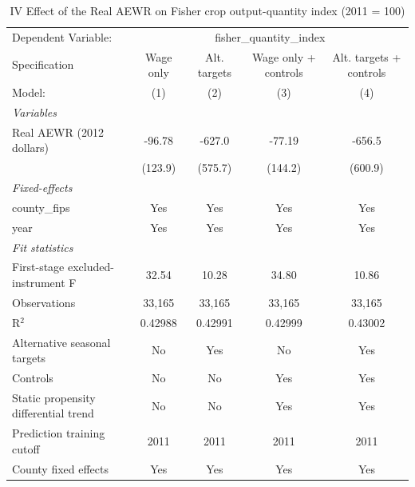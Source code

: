 
\begin{table}[htbp]
   \caption{\label{tab:iv_output_quantities} IV Effect of the Real AEWR on Fisher crop output-quantity index (2011 = 100)}
   \centering
   \begin{tabular}{lcccc}
      \tabularnewline \midrule \midrule
      Dependent Variable: & \multicolumn{4}{c}{fisher\_quantity\_index}\\
      Specification                        & Wage only & Alt. targets & Wage only + controls & Alt. targets + controls \\   
      Model:                               & (1)       & (2)          & (3)                  & (4)\\  
      \midrule
      \emph{Variables}\\
      Real AEWR (2012 dollars)             & -96.78    & -627.0       & -77.19               & -656.5\\   
                                           & (123.9)   & (575.7)      & (144.2)              & (600.9)\\   
      \midrule
      \emph{Fixed-effects}\\
      county\_fips                         & Yes       & Yes          & Yes                  & Yes\\  
      year                                 & Yes       & Yes          & Yes                  & Yes\\  
      \midrule
      \emph{Fit statistics}\\
      First-stage excluded-instrument F    & 32.54     & 10.28        & 34.80                & 10.86\\  
      Observations                         & 33,165    & 33,165       & 33,165               & 33,165\\  
      R$^2$                                & 0.42988   & 0.42991      & 0.42999              & 0.43002\\  
      Alternative seasonal targets         & No        & Yes          & No                   & Yes\\  
      Controls                             & No        & No           & Yes                  & Yes\\  
      Static propensity differential trend & No        & No           & Yes                  & Yes\\  
      Prediction training cutoff           & 2011      & 2011         & 2011                 & 2011\\  
      County fixed effects                 & Yes       & Yes          & Yes                  & Yes\\  

\end{tabular}
\end{table}
